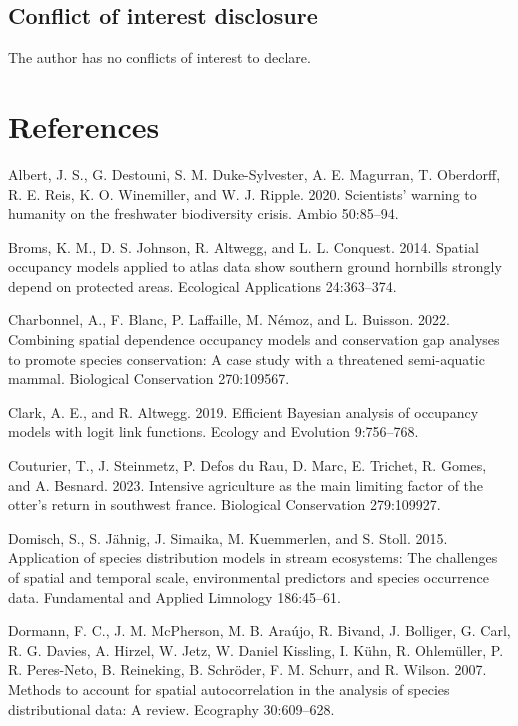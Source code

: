 \documentclass[
  11pt,
  a4paper,
]{article}
\newlength{\cslhangindent}
\newenvironment{CSLReferences}[2] %
 {\begin{list}{}{%
  \setlength{\itemindent}{0pt}
  \setlength{\leftmargin}{0pt}
  \setlength{\parsep}{0pt}
  \ifodd #1
   \setlength{\leftmargin}{\cslhangindent}
   \setlength{\itemindent}{-1\cslhangindent}
  \fi
  \setlength{\itemsep}{#2\baselineskip}}}
 {\end{list}}
\begin{document}
\subsection{Conflict of interest disclosure}\label{conflict-of-interest-disclosure}

The author has no conflicts of interest to declare.

\section{References}\label{references}

\label{refs}
\begin{CSLReferences}{1}{0}
Albert, J. S., G. Destouni, S. M. Duke-Sylvester, A. E. Magurran, T. Oberdorff, R. E. Reis, K. O. Winemiller, and W. J. Ripple. 2020. Scientists' warning to humanity on the freshwater biodiversity crisis. Ambio 50:85--94.

Broms, K. M., D. S. Johnson, R. Altwegg, and L. L. Conquest. 2014. Spatial occupancy models applied to atlas data show southern ground hornbills strongly depend on protected areas. Ecological Applications 24:363--374.

Charbonnel, A., F. Blanc, P. Laffaille, M. Némoz, and L. Buisson. 2022. Combining spatial dependence occupancy models and conservation gap analyses to promote species conservation: A case study with a threatened semi-aquatic mammal. Biological Conservation 270:109567.

Clark, A. E., and R. Altwegg. 2019. Efficient {B}ayesian analysis of occupancy models with logit link functions. Ecology and Evolution 9:756--768.

Couturier, T., J. Steinmetz, P. Defos du Rau, D. Marc, E. Trichet, R. Gomes, and A. Besnard. 2023. Intensive agriculture as the main limiting factor of the otter's return in southwest france. Biological Conservation 279:109927.

Domisch, S., S. Jähnig, J. Simaika, M. Kuemmerlen, and S. Stoll. 2015. Application of species distribution models in stream ecosystems: The challenges of spatial and temporal scale, environmental predictors and species occurrence data. Fundamental and Applied Limnology 186:45--61.

Dormann, F. C., J. M. McPherson, M. B. Araújo, R. Bivand, J. Bolliger, G. Carl, R. G. Davies, A. Hirzel, W. Jetz, W. Daniel Kissling, I. Kühn, R. Ohlemüller, P. R. Peres-Neto, B. Reineking, B. Schröder, F. M. Schurr, and R. Wilson. 2007. Methods to account for spatial autocorrelation in the analysis of species distributional data: A review. Ecography 30:609--628.


\end{CSLReferences}
\end{document}
